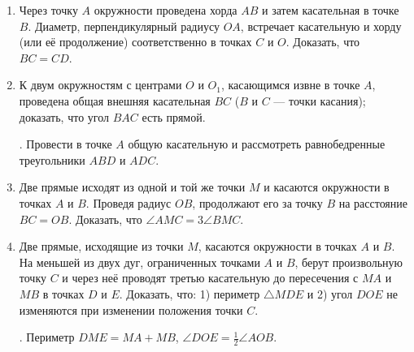 \documentclass[oneside]{book}
\begin{document}
\begin{enumerate}[resume]
 \item
Через точку $A$ окружности проведена хорда $AB$ и затем касательная в точке $B$.
Диаметр, перпендикулярный радиусу $OA$, встречает касательную и хорду (или её продолжение) соответственно в точках $C$ и $O$.
Доказать, что $BC=CD$.

 \item
К двум окружностям с центрами $O$ и $O_1$, касающимся извне в точке $A$, проведена общая внешняя касательная $BC$ ($B$ и $C$ — точки касания);
доказать, что угол $BAC$ есть прямой.

\smallskip
{}.
Провести в точке $A$ общую касательную и рассмотреть равнобедренные треугольники $ABD$ и $ADC$.

 \item
Две прямые исходят из одной и той же точки $M$ и касаются окружности в точках $A$ и $B$.
Проведя радиус $OB$, продолжают его за точку $B$ на расстояние $BC=OB$.
Доказать, что $\angle AMC=3\angle BMC$.

 \item
Две прямые, исходящие из точки $M$, касаются окружности в точках $A$ и $B$.
На меньшей из двух дуг, ограниченных точками $A$ и $B$, берут произвольную точку $C$ и через неё проводят третью касательную до пересечения с $MA$ и $MB$ в точках $D$ и $E$.
Доказать, что:
1) периметр $\triangle MDE$ и 2) угол $DOE$ не изменяются при изменении положения точки $C$.

\smallskip
{}.
Периметр $DME=MA+MB$, $\angle DOE=\tfrac12 \angle AOB$.



\end{enumerate}

\begin{center}
\end{center}
\end{document}

